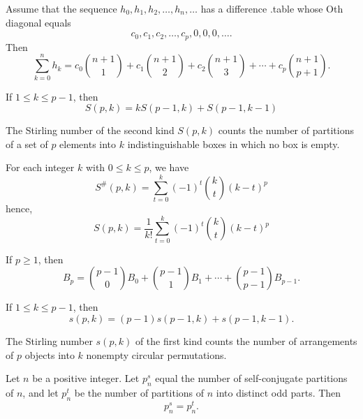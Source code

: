 \begin{theorem}
  \label{thm:8.2.3}
  Assume that the sequence $h_0, h_1, h_2, \ldots, h_n, \ldots$ has a difference .table whose Oth 
  diagonal equals
  \[ c_0, c_1, c_2, \ldots, c_p, 0, 0, 0, \ldots. \]
  Then
  \begin{equation}
    \sum\limits_{k = 0}^{n}h_k = c_0\binom{n+1}{1} + c_1\binom{n+1}{2} + c_2\binom{n+1}{3} + \cdots 
    + c_p\binom{n+1}{p+1}.
  \end{equation}
\end{theorem}

\begin{theorem}
  \label{thm:8.2.4}
  If $1 \leq k \leq p- 1$, then
  \[ S(p, k) = kS(p-1, k) + S(p-1, k-1) \]
\end{theorem}

\begin{theorem}
  \label{thm:8.2.5}
  The Stirling number of the second kind $S(p, k)$ counts the number of partitions of a set of $p$ 
  elements into $k$ indistinguishable boxes in which no box is empty.
\end{theorem}

\begin{theorem}
  \label{thm:8.2.6}
  For each integer $k$ with $0 \leq k \leq p$, we have
  \[ S^{\#}(p, k) = \sum\limits_{t = 0}^{k} (-1)^t \binom{k}{t}(k-t)^p \]
  hence,
  \[ S(p, k) = \frac{1}{k!}\sum\limits_{t = 0}^{k} (-1)^t \binom{k}{t}(k-t)^p \]
\end{theorem}

\begin{theorem}
  \label{thm:8.2.7}
  If $p \geq 1$, then 
  \[ B_p = \binom{p-1}{0}B_0 + \binom{p-1}{1}B_1 + \cdots + \binom{p-1}{p-1}B_{p-1}. \]
\end{theorem}

\begin{theorem}
  \label{thm:8.2.8}
  If $1 \leq k \leq p- 1$, then
  \[ s(p, k) = (p-1)s(p-1, k) + s(p-1, k-1). \]
\end{theorem}

\begin{theorem}
  \label{thm:8.2.9}
  The Stirling number $s(p, k)$ of the first kind counts the number of arrangements of $p$ objects 
  into $k$ nonempty circular permutations.
\end{theorem}

\begin{theorem}
  \label{thm:8.3.2}
  Let $n$ be a positive integer. Let $p_n^s$ equal the number of self-conjugate partitions of $n$, 
  and let $p_n^t$ be the number of partitions of $n$ into distinct odd parts. Then
  \[ p_n^s = p_n^t. \]
\end{theorem}

